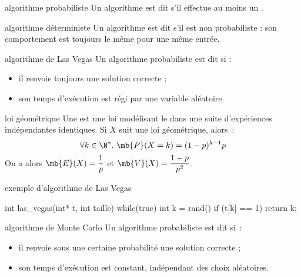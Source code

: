 

\begin{adjustwidth}{-3cm}{-3cm}


\begin{definition}{6.1}{algorithme probabiliste}
    Un algorithme est dit  s'il effectue au moins un .
\end{definition}

\begin{definition}{6.2}{algorithme déterministe}
    Un algorithme est dit  s'il est non probabiliste : son comportement est toujours le même pour une même entrée.
\end{definition}

\begin{definition}{6.3}{algorithme de Las Vegas}
    Un algorithme probabiliste est dit  si : 
    \begin{itemize}
        \item il renvoie toujours une solution correcte ;
        \item son temps d'exécution est régi par une variable aléatoire.
    \end{itemize}
\end{definition}

\begin{definition}{6.4}{loi géométrique}
    Une  est une loi modélisant le  dans une suite d'expériences indépendantes identiques. Si $X$ suit une loi géométrique, alors~:
    $$\forall k \in \N^*,\, \mb{P}(X = k) = (1-p)^{k-1} p$$
    On a alors $\displaystyle \mb{E}(X) = \frac{1}{p}$ et $\displaystyle \mb{V}(X) = \frac{1-p}{p^2}$.
\end{definition}

\begin{implementation}{exemple d'algorithme de Las Vegas}
    \begin{lstC}
    int las_vegas(int* t, int taille){
        while(true) {
            int k = rand() %
            if (t[k] == 1){
                return k;
            }
        }
    }
    \end{lstC}
\end{implementation}

\begin{definition}{6.5}{algorithme de Monte Carlo}
    Un algorithme probabiliste est dit  si~: 
    \begin{itemize}
        \item il renvoie sous une certaine probabilité une solution correcte ;
        \item son temps d'exécution est constant, indépendant des choix aléatoires. 
    \end{itemize}
\end{definition}


\end{adjustwidth}
